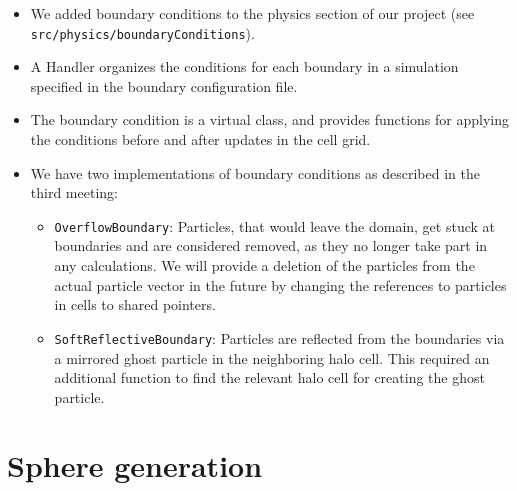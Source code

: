 \documentclass{article}
\begin{document}
\begin{itemize}
    \item We added boundary conditions to the physics section of our project (see \texttt{src/physics/boundaryConditions}).
    \item A Handler organizes the conditions for each boundary in a simulation specified in the boundary configuration file.
    \item The boundary condition is a virtual class, and provides functions for applying the conditions before and after updates in the cell grid.
    \item We have two implementations of boundary conditions as described in the third meeting:
    \begin{itemize}
        \item \texttt{OverflowBoundary}: Particles, that would leave the domain, get stuck at boundaries and are considered removed, as they no longer take part in any calculations. We will provide a deletion of the particles from the actual particle vector in the future by changing the references to particles in cells to shared pointers.
        \item \texttt{SoftReflectiveBoundary}: Particles are reflected from the boundaries via a mirrored ghost particle in the neighboring halo cell. This required an additional function to find the relevant halo cell for creating the ghost particle.
    \end{itemize}
\end{itemize}

\section{Sphere generation}
\label{sec:sphere}
\end{document}
